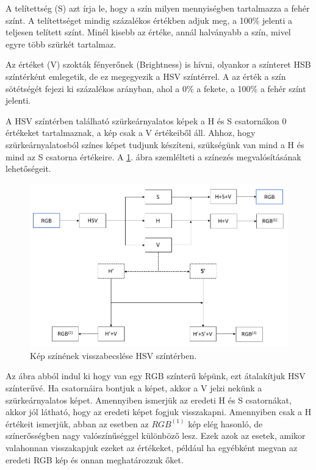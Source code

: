 A telítettség (S) azt írja le, hogy a szín milyen mennyiségben tartalmazza a fehér színt. A telítettséget mindig százalékos értékben adjuk meg, a 100\% jelenti a teljesen telített színt. Minél kisebb az értéke, annál halványabb a szín, mivel egyre több szürkét tartalmaz.

Az értéket (V) szokták fényerőnek (Brightness) is hívni, olyankor a színteret HSB színtérként emlegetik, de ez megegyezik a HSV színtérrel. A az érték a szín sötétségét fejezi ki százalékos arányban, ahol a 0\% a fekete, a 100\% a fehér színt jelenti. \cite{colorspaces}

A HSV színtérben található szürkeárnyalatos képek a H és S csatornákon 0 értékeket tartalmaznak, a kép csak a V értékeiből áll. Ahhoz, hogy szürkeárnyalatosból színes képet tudjunk készíteni, szükségünk van mind a H és mind az S csatorna értékeire. A \ref{fig:hsv_colorization}. ábra szemlélteti a színezés megvalósításának lehetőségeit. 

\begin{figure}[h]
\centering
\includegraphics[scale=0.5]{images/hsv_colorization.png}
\caption{Kép színének visszabecslése HSV színtérben.}
\label{fig:hsv_colorization}
\end{figure}

Az ábra abból indul ki hogy van egy RGB színterű képünk, ezt átalakítjuk HSV színterűvé. Ha csatornáira bontjuk a képet, akkor a V  jelzi nekünk a szürkeárnyalatos képet. Amennyiben ismerjük az eredeti H és S csatornákat, akkor jól látható, hogy az eredeti képet fogjuk visszakapni. Amennyiben csak a H értékeit ismerjük, abban az esetben az $RGB^{(1)}$ kép elég hasonló, de színerősségben nagy valószínűséggel különböző lesz. Ezek azok az esetek, amikor valahonnan visszakapjuk ezeket az értékeket, például ha egyébként megvan az eredeti RGB kép és onnan meghatározzuk őket.

